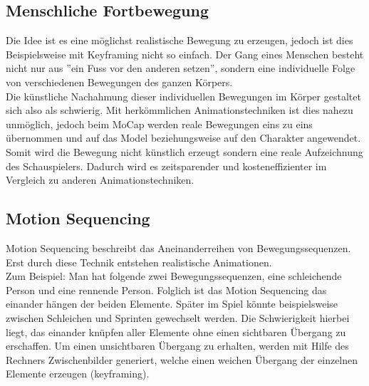 \subsection{Menschliche Fortbewegung}

Die Idee ist es eine möglichst realistische Bewegung zu erzeugen, jedoch ist 
dies Beispielsweise mit Keyframing nicht so einfach. Der Gang eines Menschen 
besteht nicht nur aus ''ein Fuss vor den anderen setzen'', sondern eine individuelle 
Folge von verschiedenen Bewegungen des ganzen Körpers. \\
Die künstliche Nachahmung dieser individuellen Bewegungen im Körper gestaltet sich also als schwierig. 
Mit herkömmlichen Animationstechniken ist dies nahezu unmöglich, jedoch beim MoCap 
werden reale Bewegungen eins zu eins übernommen und auf das Model beziehungsweise 
auf den Charakter angewendet. Somit wird die Bewegung nicht künstlich erzeugt sondern 
eine reale Aufzeichnung des Schauspielers. Dadurch wird es zeitsparender und kosteneffizienter
im Vergleich zu anderen Animationstechniken.

\subsection{Motion Sequencing}
Motion Sequencing beschreibt das Aneinanderreihen von Bewegungssequenzen. Erst durch diese Technik
entstehen realistische Animationen. \\
Zum Beispiel: Man hat folgende zwei Bewegungssequenzen, eine
schleichende Person und eine rennende Person. Folglich ist das Motion Sequencing das einander hängen 
der beiden Elemente. Später im Spiel könnte beispielsweise zwischen Schleichen und Sprinten gewechselt
werden. Die Schwierigkeit hierbei liegt, das einander knüpfen aller Elemente ohne einen sichtbaren
Übergang zu erschaffen. Um einen unsichtbaren Übergang zu erhalten, werden mit Hilfe des Rechners 
Zwischenbilder generiert, welche einen weichen Übergang der einzelnen Elemente erzeugen (keyframing).
 	


